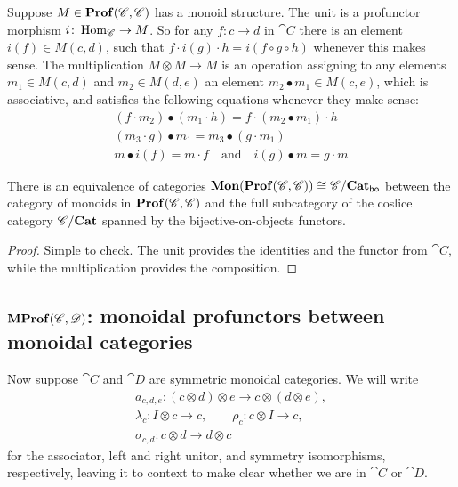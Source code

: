 \documentclass[12pt,oneside,article,draft]{memoir}
\begin{document}
Suppose $M\in\mathbf{Prof}(\mathscr{C},\mathscr{C})$ has a monoid structure. The unit is a profunctor morphism $i\colon\operatorname{Hom}_{\mathscr{C}}\to M$. So for any $f\colon c\to d$ in $\cat{C}$ there is an element $i(f)\in M(c,d)$, such that $f\cdot i(g)\cdot h = i(f\circ g\circ h)$ whenever this makes sense. The multiplication $M\otimes M\to M$ is an operation assigning to any elements $m_1\in M(c,d)$ and $m_2\in M(d,e)$ an element $m_2\bullet m_1\in M(c,e)$, which is associative, and satisfies the following equations whenever they make sense:
\begin{gather*}
	(f\cdot m_2)\bullet(m_1\cdot h) = f\cdot(m_2\bullet m_1)\cdot h \\
	(m_3\cdot g)\bullet m_1 = m_3\bullet(g\cdot m_1) \\
	m\bullet i(f) = m\cdot f \quad\text{and}\quad i(g)\bullet m = g\cdot m
\end{gather*}

\begin{lemma}\label{lemma:CCprofunctors}
	There is an equivalence of categories $\mathbf{Mon}(\mathbf{Prof}(\mathscr{C},\mathscr{C}))\cong \mathscr{C}/\mathbf{Cat}_{\mathsf{bo}}$ between the category of monoids in $\mathbf{Prof}(\mathscr{C},\mathscr{C})$ and the full subcategory of the coslice category $\mathscr{C}/\mathbf{Cat}$ spanned by the bijective-on-objects functors. 
\end{lemma}
\begin{proof}
	Simple to check. The unit provides the identities and the functor from $\cat{C}$, while the multiplication provides the composition.
\end{proof}

\subsection{$\mathbf{MProf}(\mathscr{C},\mathscr{D})$: monoidal profunctors between monoidal categories}
Now suppose $\cat{C}$ and $\cat{D}$ are symmetric monoidal categories. We will write
\begin{gather*}
	a_{c,d,e}\colon (c\otimes d)\otimes e \to c\otimes(d\otimes e), \\
		\lambda_c\colon I\otimes c\to c,
		\qquad \rho_c\colon c\otimes I \to c, \\
		\sigma_{c,d}\colon c\otimes d\to d\otimes c
\end{gather*}
for the associator, left and right unitor, and symmetry isomorphisms, respectively, leaving it to context to make clear whether we are in $\cat{C}$ or $\cat{D}$.
\end{document}

